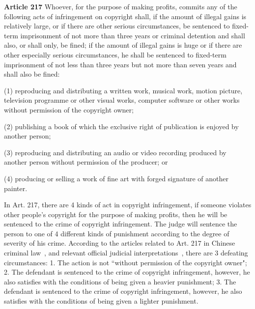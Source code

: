 \documentclass{IOS-Book-Article}
\begin{document}
\footnotesize
\begin{adjustwidth}{0.5cm}{0cm}
\noindent \textbf{Article 217} Whoever, for the purpose of making profits, commits any of the following acts of infringement on copyright shall, if the amount of illegal gains is relatively large, or if there are other serious circumstances, be sentenced to fixed-term imprisonment of not more than three years or criminal detention and shall also, or shall only, be fined; if the amount of illegal gains is huge or if there are other especially serious circumstances, he shall be sentenced to fixed-term imprisonment of not less than three years but not more than seven years and shall also be fined:

\noindent (1) reproducing and distributing a written work, musical work, motion picture, television programme or other visual works, computer software or other works without permission of the copyright owner;

\noindent (2) publishing a book of which the exclusive right of publication is enjoyed by another person;

\noindent (3) reproducing and distributing an audio or video recording produced by another person without permission of the producer; or

\noindent (4) producing or selling a work of fine art with forged signature of another painter.\newline
\end{adjustwidth}

\normalsize
\noindent 
In Art. 217, there are 4 kinds of act in copyright infringement, if someone violates other people's copyright for the purpose of making profits, then he will be sentenced to the crime of copyright infringement. The judge will sentence the person to one of 4 different kinds of punishment according to the degree of severity of his crime. According to the articles related to Art. 217 in Chinese criminal law~\cite{NPC1997CCL}, and relevant official judicial interpretations~\cite{SupremeCourt2011Judicial}, there are 3 defeating circumstances: 1. The action is not ``without permission of the copyright owner"; 2. The defendant is sentenced to the crime of copyright infringement, however, he also satisfies with the conditions of being given a heavier punishment; 3. The defendant is sentenced to the crime of copyright infringement, however, he also satisfies with the conditions of being given a lighter punishment.
\end{document}
